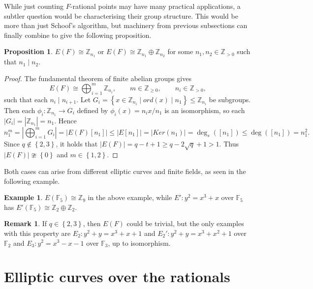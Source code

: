 \documentclass{article}
\newcommand{\F}{\mathbb{F}}
\newcommand{\Z}{\mathbb{Z}}
\newcommand{\rb}[1]{\left( #1 \right)}
\renewcommand{\sb}[1]{\left[ #1 \right]}
\newcommand{\cb}[1]{\left\{ #1 \right\}}
\newcommand{\abs}[1]{\left\lvert #1 \right\rvert}
\theoremstyle{definition}\newtheorem*{definition}{Definition}
\theoremstyle{definition}\newtheorem*{example}{Example}
\theoremstyle{definition}\newtheorem*{remark}{Remark}
\newtheorem{proposition}{Proposition}[subsection]
\begin{document}
While just counting $ F $-rational points may have many practical applications, a subtler question would be characterising their group structure. This would be more than just Schoof's algorithm, but machinery from previous subsections can finally combine to give the following proposition.

\begin{proposition}
$ E\rb{F} \cong \Z_{n_1} $ or $ E\rb{F} \cong \Z_{n_1} \oplus \Z_{n_2} $ for some $ n_1, n_2 \in \Z_{> 0} $ such that $ n_1 \mid n_2 $.
\end{proposition}

\begin{proof}
The fundamental theorem of finite abelian groups gives
$$ E\rb{F} \cong \bigoplus_{i = 1}^m \Z_{n_i}, \qquad m \in \Z_{\ge 0}, \qquad n_i \in \Z_{> 0}, $$
such that each $ n_i \mid n_{i + 1} $. Let $ G_i = \cb{x \in \Z_{n_i} \mid ord\rb{x} \mid n_1} \le \Z_{n_i} $ be subgroups. Then each $ \phi_i : \Z_{n_1} \to G_i $ defined by $ \phi_i\rb{x} = n_ix / n_1 $ is an isomorphism, so each $ \abs{G_i} = \abs{\Z_{n_1}} = n_1 $. Hence
$$ n_1^m = \abs{\bigoplus_{i = 1}^m G_i} = \abs{E\rb{F}\sb{n_1}} \le \abs{E\sb{n_1}} = \abs{Ker\rb{n_1}} = \deg_s\rb{\sb{n_1}} \le \deg\rb{\sb{n_1}} = n_1^2. $$
Since $ q \notin \cb{2, 3} $, it holds that $ \abs{E\rb{F}} = q - t + 1 \ge q - 2\sqrt{q} + 1 > 1 $. Thus $ \abs{E\rb{F}} \ncong \cb{0} $ and $ m \in \cb{1, 2} $.
\end{proof}

Both cases can arise from different elliptic curves and finite fields, as seen in the following example.

\begin{example}
$ E\rb{\F_5} \cong \Z_9 $ in the above example, while $ E' : y^2 = x^3 + x $ over $ \F_5 $ has $ E'\rb{\F_5} \cong \Z_2 \oplus \Z_2 $.
\end{example}

\begin{remark}
If $ q \in \cb{2, 3} $, then $ E\rb{F} $ could be trivial, but the only examples with this property are $ E_2 : y^2 + y = x^3 + x + 1 $ and $ E_2' : y^2 + y = x^3 + x^2 + 1 $ over $ \F_2 $ and $ E_3 : y^2 = x^3 - x - 1 $ over $ \F_3 $, up to isomorphism.
\end{remark}

\pagebreak

\section{Elliptic curves over the rationals}
\end{document}

